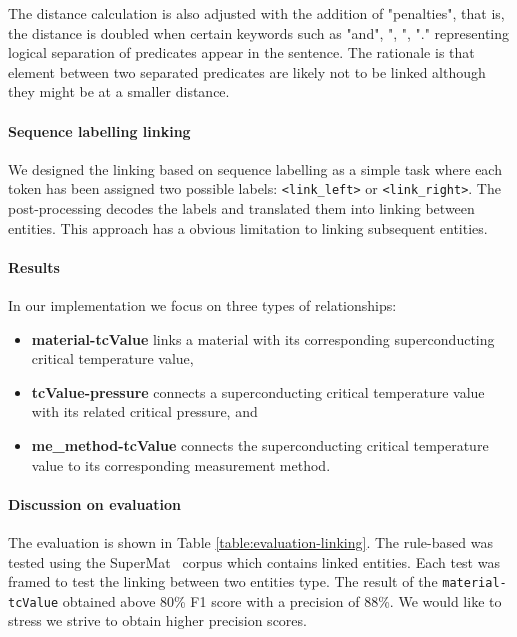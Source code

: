 \documentclass{article}
\begin{document}
The distance calculation is also adjusted with the addition of "penalties", that is, the distance is doubled when certain keywords such as "and", ", ", "." representing logical separation of predicates appear in the sentence. The rationale is that element between two separated predicates are likely not to be linked although they might be at a smaller distance. 

\paragraph{Sequence labelling linking} We designed the linking based on sequence labelling as a simple task where each token has been assigned two possible labels: \texttt{<link\_left>} or \texttt{<link\_right>}. The post-processing decodes the labels and translated them into linking between entities. 
This approach has a obvious limitation to linking subsequent entities.  

\paragraph{Results} In our implementation we focus on three types of relationships: 
\begin{itemize}
    \item \textbf{material-tcValue} links a material with its corresponding superconducting critical temperature value, 
    \item \textbf{tcValue-pressure} connects a superconducting critical temperature value with its related critical pressure, and 
    \item \textbf{me\_method-tcValue} connects the superconducting critical temperature value to its corresponding measurement method.
\end{itemize}

\paragraph{Discussion on evaluation}
The evaluation is shown in Table \ref{table:evaluation-linking}. 
The rule-based was tested using the SuperMat~\cite{foppiano2021supermat} corpus which contains linked entities. Each test was framed to test the linking between two entities type. 
The result of the \texttt{material-tcValue} obtained above 80\% F1 score with a precision of 88\%. We would like to stress we strive to obtain higher precision scores. 
\end{document}

